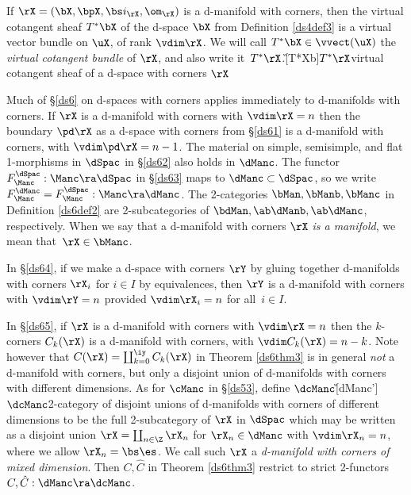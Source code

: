 \documentclass{article}
\begin{document}
\begin{dfn}
If $\rX=(\bX,\bpX,\bs i_\rX,\om_\rX)$ is a d-manifold with corners,
then the virtual cotangent sheaf $T^*\bX$ of the d-space $\bX$ from
Definition \ref{ds4def3} is a virtual vector bundle on $\uX$, of rank $\vdim\rX$. We will call
$T^*\bX\in\vvect(\uX)$ the {\it virtual cotangent
bundle\/} of $\rX$, and also write
it~$T^*\rX$.\G[T*Xb]{$T^*\rX$}{virtual cotangent sheaf of a d-space
with corners $\rX$}
\label{ds7def1}
\end{dfn}

Much of \S\ref{ds6} on d-spaces with corners applies immediately to
d-manifolds with corners. If $\rX$ is a d-manifold with corners with
$\vdim\rX=n$ then the boundary $\pd\rX$ as a d-space with corners
from \S\ref{ds61} is a d-manifold with corners, with
$\vdim\pd\rX=n-1$. The material
on simple, semisimple, and flat 1-morphisms in $\dSpac$ in
\S\ref{ds62} also holds in $\dManc$. The functor
$F_\Manc^\dSpac:\Manc\ra\dSpac$ in \S\ref{ds63} maps to
$\dManc\subset\dSpac$, so we write $F_\Manc^\dManc=
F_\Manc^\dSpac:\Manc\ra\dManc$. The 2-categories
$\bMan,\bManb,\bManc$ in Definition \ref{ds6def2} are
2-subcategories of $\bdMan,\ab\dManb,\ab\dManc$, respectively. When
we say that a d-manifold with corners $\rX$ {\it is a
manifold}, we mean
that~$\rX\in\bManc$.

In \S\ref{ds64}, if we make a d-space with corners $\rY$ by gluing
together d-manifolds with corners $\rX_i$ for $i\in I$ by
equivalences, then $\rY$ is a d-manifold with corners with
$\vdim\rY=n$ provided $\vdim\rX_i=n$ for all~$i\in I$.

In \S\ref{ds65}, if $\rX$ is a d-manifold with corners with
$\vdim\rX=n$ then the $k$-corners $C_k(\rX)$ is a d-manifold with
corners, with $\vdim C_k(\rX)=n-k$. Note however that
$C(\rX)=\coprod_{k=0}^\iy C_k(\rX)$ in Theorem \ref{ds6thm3} is in
general {\it not\/} a d-manifold with corners, but only a disjoint
union of d-manifolds with corners with different dimensions. As for
$\cManc$ in \S\ref{ds53}, define
$\dcManc$\G[dManc']{$\dcManc$}{2-category of disjoint unions of
d-manifolds with corners of different dimensions} to be the full
2-subcategory of $\rX$ in $\dSpac$ which may be written as a
disjoint union $\rX=\coprod_{n\in\Z}\rX_n$ for $\rX_n\in\dManc$ with
$\vdim\rX_n=n$, where we allow $\rX_n=\bs\es$. We call such $\rX$ a
{\it d-manifold with corners of mixed dimension}. Then $C,\hat C$ in Theorem \ref{ds6thm3}
restrict to strict 2-functors~$C,\hat C:\dManc\ra\dcManc$.
\end{document}
